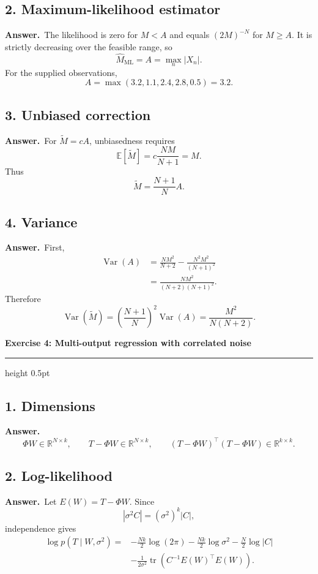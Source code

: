\documentclass[11pt,a4paper]{article}
\newcommand{\exercise}[2]{%
  \Needspace{8\baselineskip}%
  \par\addvspace{1.1em}%
  {\Large\bfseries\color{examblue}Exercise #1: #2\par}%
  \nobreak\vspace{0.2em}%
  {\color{rulegray}\hrule height 0.5pt}%
  \vspace{0.55em}%
}
\newcommand{\answer}{\textbf{Answer.}\ }
\begin{document}
\subsection*{2. Maximum-likelihood estimator}

\answer The likelihood is zero for $M<A$ and equals $(2M)^{-N}$ for $M\geq A$. It is strictly decreasing over the feasible range, so
\[
  \boxed{\widehat M_{\mathrm{ML}}=A=\max_n|X_n|}.
\]
For the supplied observations,
\[
  A=\max(3.2,1.1,2.4,2.8,0.5)=\boxed{3.2}.
\]

\subsection*{3. Unbiased correction}

\answer For $\widetilde M=cA$, unbiasedness requires
\[
  \mathbb{E}[\widetilde M]
  =c\frac{NM}{N+1}=M.
\]
Thus
\[
  \boxed{\widetilde M=\frac{N+1}{N}A}.
\]

\subsection*{4. Variance}

\answer First,
\begin{align*}
  \operatorname{Var}(A)
  &=\frac{NM^2}{N+2}-\frac{N^2M^2}{(N+1)^2}\\
  &=\frac{NM^2}{(N+2)(N+1)^2}.
\end{align*}
Therefore
\[
  \boxed{\operatorname{Var}(\widetilde M)
  =\left(\frac{N+1}{N}\right)^2\operatorname{Var}(A)
  =\frac{M^2}{N(N+2)}}.
\]

\exercise{4}{Multi-output regression with correlated noise}

\subsection*{1. Dimensions}

\answer
\[
  \boxed{\Phi W\in\mathbb{R}^{N\times k}},\qquad
  \boxed{T-\Phi W\in\mathbb{R}^{N\times k}},\qquad
  \boxed{(T-\Phi W)^\top(T-\Phi W)\in\mathbb{R}^{k\times k}}.
\]

\subsection*{2. Log-likelihood}

\answer Let $E(W)=T-\Phi W$. Since
\[
  |\sigma^2C|=(\sigma^2)^k|C|,
\]
independence gives
\begin{align*}
  \log p(T\mid W,\sigma^2)
  ={}&-\frac{Nk}{2}\log(2\pi)
  -\frac{Nk}{2}\log\sigma^2
  -\frac{N}{2}\log|C|\\
  &-\frac{1}{2\sigma^2}
  \operatorname{tr}\left(C^{-1}E(W)^\top E(W)\right).
\end{align*}
\end{document}
